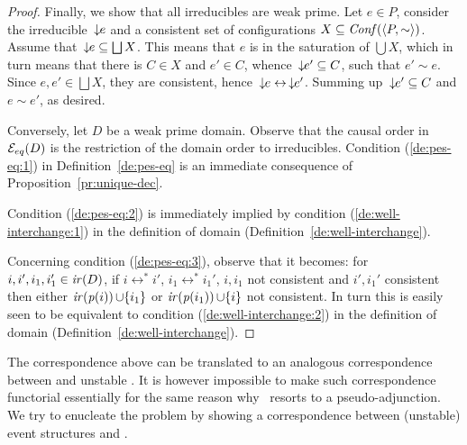 \begin{proof}
    Finally, we show that all irreducibles are weak prime. Let $e \in P$, consider the irreducible $\,\downarrow\!\!{e}$ and a consistent set of configurations $X \subseteq \mathit{Conf}({\langle P, \sim \rangle})$. Assume that $\,\downarrow\!\!{e} \subseteq \bigsqcup X$. This means that $e$ is in the saturation of $\bigcup X$, which in turn means that there is $C \in X$ and $e' \in C$, whence $\,\downarrow\!\!{e'} \subseteq C$, such that $e' \sim e$. Since $e, e' \in  \bigsqcup X$, they are consistent, hence $\,\downarrow\!\!{e} \leftrightarrow \,\downarrow\!\!{e'}$. Summing up $\,\downarrow\!\!{e'} \subseteq C$ and $e \sim e'$, as desired.
  

  Conversely, let $D$ be a weak  prime domain. Observe that the causal
  order  in $\mathcal{E}_{eq}({D})$  is  the  restriction of  the  domain order  to
  irreducibles. Condition (\ref{de:pes-eq:1}) in Definition~\ref{de:pes-eq} is an immediate consequence of Proposition~\ref{pr:unique-dec}.


    Condition (\ref{de:pes-eq:2}) is immediately implied by condition
    (\ref{de:well-interchange:1}) in the definition of {\wi} domain
    (Definition~\ref{de:well-interchange}).
    
    Concerning condition (\ref{de:pes-eq:3}), observe that it becomes:
    for $i, i', i_1, i_1' \in \mathop{\mathit{ir}({D})}$, if $i \leftrightarrow^* i'$,
    $i_1 \leftrightarrow^* i_1'$, $i, i_1$ not consistent and
    $i', i_1'$ consistent then either $\mathop{\mathit{ir}({\mathit{p}({i})})} \cup \{i_1\}$ or
    $\mathop{\mathit{ir}({\mathit{p}({i_1})})} \cup \{i\}$ not consistent. In turn this is
    easily seen to be equivalent to condition
    (\ref{de:well-interchange:2}) in the definition of {\wi} domain
    (Definition~\ref{de:well-interchange}).
\end{proof}


The correspondence above can be translated to an analogous
correspondence between {\eseqabbr} and unstable {\esabbr}. It is
however impossible to make such correspondence functorial essentially for
the same reason why~\cite{win2017,VismeW19} resorts to a pseudo-adjunction. 
We try to enucleate the problem by showing a correspondence between
(unstable) event structures and {\eseqabbr}.

